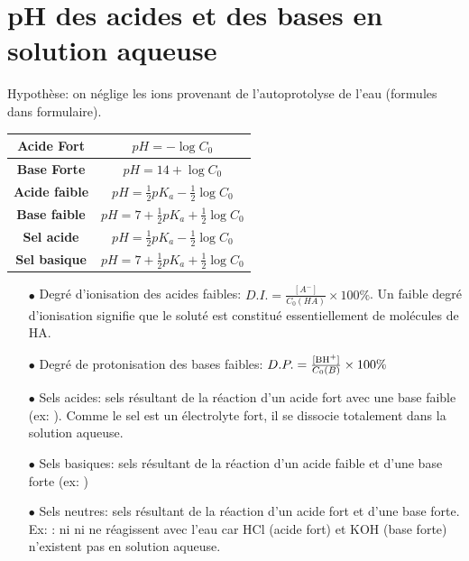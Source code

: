 \documentclass[11pt,a4paper,french]{article}
\begin{document}
\section{pH des acides et des bases en solution aqueuse}

Hypothèse: on néglige les ions  provenant de l'autoprotolyse de l'eau (formules dans formulaire).

\renewcommand{\arraystretch}{1.5}
\begin{tabular}{|>{\bf}c|c|}
	\hline
	Acide Fort & $pH=-\log{C_0}$ \\
	\hline
	Base Forte & $pH=14+\log{C_0}$ \\
	\hline
	Acide faible & $pH=\frac{1}{2}pK_a-\frac{1}{2}\log{C_0}$ \\
	\hline
	Base faible & $pH=7+\frac{1}{2}pK_a+\frac{1}{2}\log{C_0}$ \\
	\hline
	Sel acide & $pH=\frac{1}{2}pK_a-\frac{1}{2}\log{C_0}$ \\
	\hline
	Sel basique & $pH=7+\frac{1}{2}pK_a+\frac{1}{2}\log{C_0}$ \\
	\hline
\end{tabular}

\vspace{1cm}

\begin{itemize}

\item[$\bullet$] Degré d'ionisation des acides faibles: $D.I.=\frac{[A^{-}]}{C_0(HA)}\times 100\%$.
	Un faible degré d'ionisation signifie que le soluté est constitué essentiellement de molécules de HA.

\item[$\bullet$] Degré de protonisation des bases faibles: $D.P.=\frac{[\ce{BH+}]}{C_0(B)}\times 100\%$

\item[$\bullet$] Sels acides: sels résultant de la réaction d'un acide fort avec une base faible (ex: ).
	Comme le sel est un électrolyte fort, il se dissocie totalement dans la solution aqueuse.

\item[$\bullet$] Sels basiques: sels résultant de la réaction d'un acide faible et d'une base forte (ex: )

\item[$\bullet$] Sels neutres: sels résultant de la réaction d'un acide fort et d'une base forte.
	Ex: : ni  ni  ne réagissent avec l'eau car HCl (acide fort) et KOH (base forte) n'existent pas en solution aqueuse.
\end{itemize}
\end{document}
